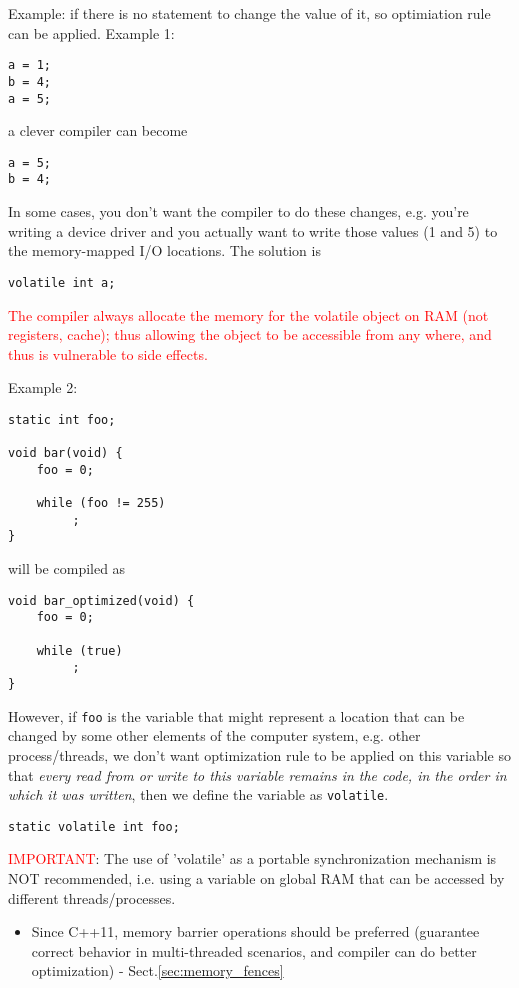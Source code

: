 Example: if there is no statement to change the value of it, so optimiation rule
can be applied.
Example 1:
\begin{verbatim}
a = 1;
b = 4; 
a = 5;
\end{verbatim}
a clever compiler can become
\begin{verbatim}
a = 5;
b = 4;
\end{verbatim}
In some cases, you don't want the compiler to do these changes, e.g. you're
writing a device driver and you actually want to write those values (1 and 5) to
the memory-mapped I/O locations. The solution is
\begin{lstlisting}
volatile int a;
\end{lstlisting}

\textcolor{red}{The compiler always allocate the memory for the volatile
object on RAM (not registers, cache); thus allowing the object to be accessible
from any where, and thus is vulnerable to side effects.}

Example 2:
\begin{lstlisting}
static int foo;
 
void bar(void) {
    foo = 0;
 
    while (foo != 255)
         ;
}
\end{lstlisting}
will be compiled as
\begin{lstlisting}
void bar_optimized(void) {
    foo = 0;
 
    while (true)
         ;
}
\end{lstlisting}
However, if \verb!foo! is the variable that might represent a location that can
be changed by some other elements of the computer system, e.g.
other process/threads, we don't want optimization rule to be applied on this
variable so that {\it every read from or write to this variable remains in the
code, in the order in which it was written}, then we define the variable as
\verb!volatile!.
\begin{lstlisting}
static volatile int foo;
\end{lstlisting}


\textcolor{red}{IMPORTANT}: The use of 'volatile' as a portable synchronization
mechanism is NOT recommended, i.e. using a variable on global RAM that can be
accessed by different threads/processes.
\begin{itemize}

  \item  Since C++11, memory barrier operations should be preferred (guarantee
  correct behavior in multi-threaded scenarios, and compiler can do better
  optimization) - Sect.\ref{sec:memory_fences}

\end{itemize}

